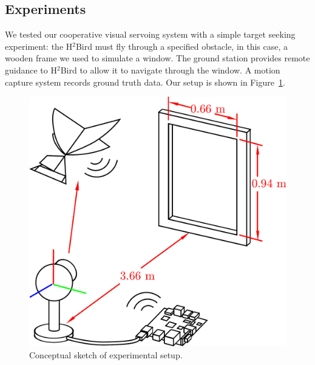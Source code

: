 \documentclass{aamas2013}
\begin{document}
\subsection{Experiments}
\label{sec:experiments_verification}

We tested our cooperative visual servoing system with a simple target seeking
experiment: the H$^2$Bird must fly through a specified obstacle, in this 
case, a wooden frame we used to simulate a window. The ground station provides remote guidance to 
H$^2$Bird to allow it to navigate through the window. A motion capture 
system records ground truth data. Our setup is shown 
in Figure~\ref{fig:experiment_cartoon}.

\begin{figure}[tb]
\centering
\includegraphics[width=0.9\linewidth]{figures/experiment_cartoon.pdf}
\caption{Conceptual sketch of experimental setup.}
\label{fig:experiment_cartoon}
\end{figure}
\end{document}
